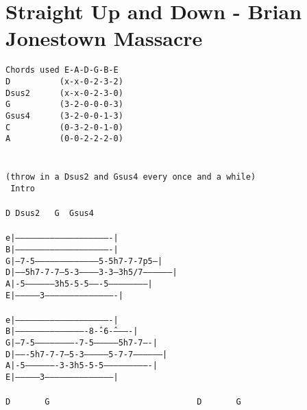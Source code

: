 \newpage
\section{Straight Up and Down - Brian Jonestown Massacre}
\label{Straight Up and Down - Brian Jonestown Massacre}
\texttt{Chords\ used\ E-A-D-G-B-E\\
D\ \ \ \ \ \ \ \ \ \ (x-x-0-2-3-2)\\
Dsus2\ \ \ \ \ \ (x-x-0-2-3-0)\\
G\ \ \ \ \ \ \ \ \ \ (3-2-0-0-0-3)\\
Gsus4\ \ \ \ \ \ (3-2-0-0-1-3)\\
C\ \ \ \ \ \ \ \ \ \ (0-3-2-0-1-0)\\
A\ \ \ \ \ \ \ \ \ \ (0-0-2-2-2-0)\\
\\
\\
(throw\ in\ a\ Dsus2\ and\ Gsus4\ every\ once\ and\ a\ while)\\
\lbrack\ Intro\rbrack\\
\\
D\ Dsus2\ \ \ G\ \ Gsus4\\
\\
e|----------------------------------------------------------|\\
B|----------------------------------------------------------|\\
G|--7-5---------------------------------------5-5h7-7-7p5---|\\
D|------5h7-7-7---5-3-----------3-3---3h5/7-----------------|\\
A|-5------------------3h5-5-5-------5-----------------------|\\
E|--------------3-------------------------------------------|\\
\\
e|----------------------------------------------------------|\\
B|-------------------------------------------8\^--6\^-----------|\\
G|---7-5-------------------------7-5---------------5h7-7----|\\
D|-------5h7-7-7---5-3---------------5-7-7------------------|\\
A|-5-------------------3-3h5-5-5----------------------------|\\
E|---------------3------------------------------------------|\\
\\
D\ \ \ \ \ \ \ G\ \ \ \ \ \ \ \ \ \ \ \ \ \ \ \ \ \ \ \ \ \ \ \ \ \ \ \ \ \ D\ \ \ \ \ \ \ G\\
}
